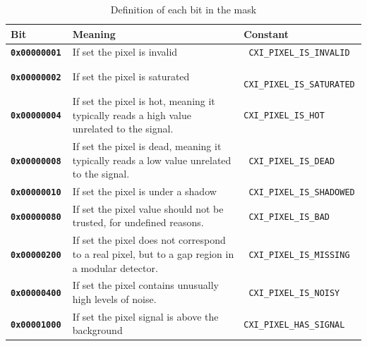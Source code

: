 \documentclass[usletter,11pt]{article}
\begin{document}
\begin{table}[h!]\footnotesize
\caption{Definition of each bit in the mask}
\begin{tabular*}{\textwidth}{@{\extracolsep{\fill}} l p{5.5cm} l}
\toprule
\sf \bfseries Bit & \sf \bfseries Meaning & \sf \bfseries Constant \\
\midrule

\tt \bfseries 0x00000001 & \sf If set the pixel is invalid & \tt
CXI\_PIXEL\_IS\_INVALID\\
\tt \bfseries 0x00000002 & \sf If set the pixel is saturated & \tt
CXI\_PIXEL\_IS\_SATURATED\\
\tt \bfseries 0x00000004 & \sf If set the pixel is hot, meaning it typically reads a high
value unrelated to the signal. & 
\tt CXI\_PIXEL\_IS\_HOT\\
\tt \bfseries 0x00000008 & \sf If set the pixel is dead, meaning it typically reads a low
value unrelated to the signal. & \tt
CXI\_PIXEL\_IS\_DEAD\\
\tt \bfseries 0x00000010 & \sf If set the pixel is under a shadow & \tt
CXI\_PIXEL\_IS\_SHADOWED\\
\tt \bfseries 0x00000080 & \sf If set the pixel value should not be trusted, for
undefined reasons. & \tt
CXI\_PIXEL\_IS\_BAD\\
\tt \bfseries 0x00000200 & \sf If set the pixel does not correspond to a real
pixel, but to a gap region in a modular detector. & \tt
CXI\_PIXEL\_IS\_MISSING\\
\tt \bfseries 0x00000400 & \sf If set the pixel contains unusually high levels
of noise. & \tt
CXI\_PIXEL\_IS\_NOISY\\
\tt \bfseries 0x00001000 & \sf If set the pixel signal is above the background &
\tt CXI\_PIXEL\_HAS\_SIGNAL\\
\bottomrule
\end{tabular*}
\end{table}
\end{document}
